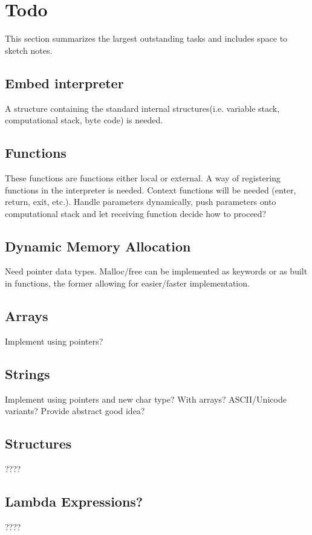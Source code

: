 \documentclass{standalone}
\begin{document}
\chapter{Todo}
	This section summarizes the largest outstanding tasks and includes space to sketch notes.

	\section{Embed interpreter}
		A structure containing the standard internal structures(i.e. variable stack, computational stack, byte code) is needed.

	\newpage

	\section{Functions}
		These functions are functions either local or external. A way of registering functions in the interpreter is needed. Context functions will be needed (enter, return, exit, etc.). Handle parameters dynamically, push parameters onto computational stack and let receiving function decide how to proceed?
	\newpage

	\section{Dynamic Memory Allocation}
		Need pointer data types. Malloc/free can be implemented as keywords or as built in functions, the former allowing for easier/faster implementation.
	\newpage

	\section{Arrays}
		Implement using pointers?
	\newpage

	\section{Strings}
		Implement using pointers and new char type? With arrays? ASCII/Unicode variants? Provide abstract good idea?
	\newpage

	\section{Structures}
		????
	\newpage

	\section{Lambda Expressions?}
		????
	\newpage
	
\end{document}
